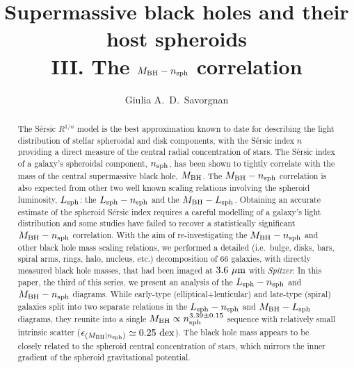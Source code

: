 \documentclass[preprint2]{emulateapj}
\begin{document}
\title{Supermassive black holes and their host spheroids \\ 
III. The $M_{\rm BH} - \lowercase{n_{\rm sph}}$ correlation }


\author{Giulia A.~D.~Savorgnan}


\begin{abstract}
The S\'ersic $R^{1/n}$ model is the best approximation known to date for describing the light distribution of stellar spheroidal and disk components, 
with the S\'ersic index $n$ providing a direct measure of the central radial concentration of stars. 
The S\'ersic index of a galaxy's spheroidal component, $n_{\rm sph}$, has been shown to tightly correlate 
with the mass of the central supermassive black hole, $M_{\rm BH}$. 
The $M_{\rm BH} - n_{\rm sph}$ correlation is also expected from other two well known scaling relations 
involving the spheroid luminosity, $L_{\rm sph}$: 
the $L_{\rm sph} - n_{\rm sph}$ and the $M_{\rm BH} - L_{\rm sph}$. 
Obtaining an accurate estimate of the spheroid S\'ersic index requires a careful modelling of a galaxy's light distribution 
and some studies have failed to recover a statistically significant $M_{\rm BH} - n_{\rm sph}$ correlation. 
With the aim of re-investigating the $M_{\rm BH} - n_{\rm sph}$ 
and other black hole mass scaling relations, 
we performed a detailed (i.e.~bulge, disks, bars, spiral arms, rings, halo, nucleus, etc.) 
decomposition of 66 galaxies, with directly measured black hole masses, 
that had been imaged at $3.6\rm~\mu m$ with \emph{Spitzer}. 
In this paper, the third of this series, we present an analysis of the $L_{\rm sph} - n_{\rm sph}$ and $M_{\rm BH} - n_{\rm sph}$ diagrams. 
While early-type (elliptical+lenticular) and late-type (spiral) galaxies split into two separate relations 
in the $L_{\rm sph} - n_{\rm sph}$ and $M_{\rm BH} - L_{\rm sph}$ diagrams, 
they reunite into a single $M_{\rm BH} \propto n_{\rm sph}^{3.39 \pm 0.15}$ sequence
with relatively small intrinsic scatter ($\epsilon_{(M_{\rm BH} | n_{\rm sph})} \simeq 0.25 \rm~dex$). 
The black hole mass appears to be closely related to the spheroid central concentration of stars, 
which mirrors the inner gradient of the spheroid gravitational potential. 
\end{abstract}


\end{document}

